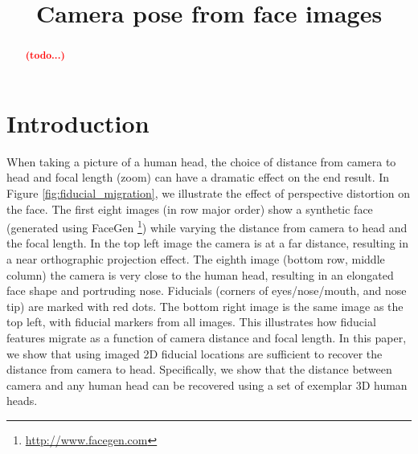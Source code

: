 \documentclass[runningheads]{llncs}
\newcommand {\afbnote} [1] {{\bf \textcolor{red}{(#1)}}}
\begin{document}
\pagestyle{headings}

\mainmatter

\title{Camera pose from face images}


\maketitle

\begin{abstract}
\afbnote{todo...}
\end{abstract}

\section{Introduction}
When taking a picture of a human head, the choice of distance from camera to head and focal length (zoom) can have a dramatic effect on the end result.  In Figure \ref{fig:fiducial_migration}, we illustrate the effect of perspective distortion on the face.  The first eight images (in row major order) show a synthetic face (generated using FaceGen \footnote{\url{http://www.facegen.com}}) while varying the distance from camera to head and the focal length.  In the top left image the camera is at a far distance, resulting in a near orthographic projection effect.  The eighth image (bottom row, middle column) the camera is very close to the human head, resulting in an elongated face shape and portruding nose.  Fiducials (corners of eyes/nose/mouth, and nose tip) are marked with red dots.  The bottom right image is the same image as the top left, with fiducial markers from all images.  This illustrates how fiducial features migrate as a function of camera distance and focal length.  In this paper, we show that using imaged 2D fiducial locations are sufficient to recover the distance from camera to head.  Specifically, we show that the distance between camera and any human head can be recovered using a set of exemplar 3D human heads.
\end{document}
